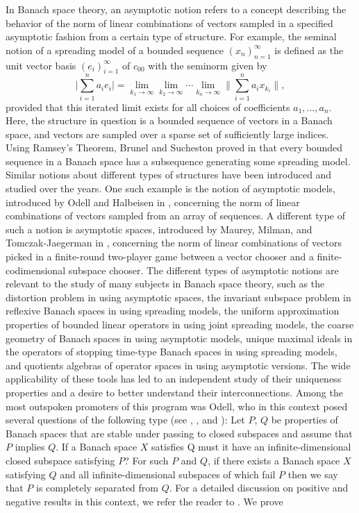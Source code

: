 \documentclass[12pt,a4paper]{amsart}
\theoremstyle{definition}
\theoremstyle{plain}
\begin{document}
In Banach space theory, an asymptotic notion refers to a concept describing the behavior of the norm of linear combinations of vectors sampled in a specified asymptotic fashion from a certain type of structure. For example, the seminal notion of a spreading model of a bounded sequence $(x_n)_{n=1}^\infty$ is defined as the unit vector basis $(e_i)_{i=1}^\infty$ of $c_{00}$ with the seminorm given by
\[\Big|\sum_{i=1}^na_i e_i\Big| = \lim_{k_1\to\infty}\lim_{k_{2}\to\infty}\cdots\lim_{k_n\to\infty}\Big\|\sum_{i=1}^na_ix_{k_i}\Big\|,\]
provided that this iterated limit exists for all choices of coefficients $a_1,\ldots,a_n$. Here, the structure in question is a bounded sequence of vectors in a Banach space, and vectors are sampled over a sparse set of sufficiently large indices. Using Ramsey's Theorem, Brunel and Sucheston proved in \cite{brunel:sucheston:1974} that every bounded sequence in a Banach space has a subsequence generating some spreading model. Similar notions about different types of structures have been introduced and studied over the years. One such example is the notion of asymptotic models, introduced by Odell and Halbeisen in \cite{halbeisen:odell:2004}, concerning the norm of linear combinations of vectors sampled from an array of sequences. A different type of such a notion is asymptotic spaces, introduced by Maurey, Milman, and Tomczak-Jaegerman in \cite{maurey:milman:tomczak-jaegermann:1995}, concerning the norm of linear combinations of vectors picked in a finite-round two-player game between a vector chooser and a finite-codimensional subspace chooser. The different types of asymptotic notions are relevant to the study of many subjects in Banach space theory, such as the distortion problem in \cite{milman:tomczak-jaegermann:1993} using asymptotic spaces, the invariant subspace problem in reflexive Banach spaces in \cite{argyros:motakis:2014} using spreading models, the uniform approximation properties of bounded linear operators in \cite{argyros:georgiou:lagos:motakis:2020} using joint spreading models, the coarse geometry of Banach spaces in \cite{baudier:lancien:motakis:schlumprecht:2021} using asymptotic models, unique maximal ideals in the operators of stopping time-type Banach spaces in \cite{kania:lechner:2022} using spreading models, and quotients algebras of operator spaces in \cite{motakis:pelczar-barwacz:2024} using asymptotic versions. The wide applicability of these tools has led to an independent study of their uniqueness properties and a desire to better understand their interconnections. Among the most outspoken promoters of this program was Odell, who in this context posed several questions of the following type (see \cite{odell:2002}, \cite{odell:2007}, and \cite{junge:kutzarova:odell:2006}): Let $P$, $Q$ be properties of Banach spaces that are stable under passing to closed subspaces and assume that $P$ implies $Q$. If a Banach space $X$ satisfies Q must it have an infinite-dimensional closed subspace satisfying $P$? For such $P$ and $Q$, if there exists a Banach space $X$ satisfying $Q$ and all infinite-dimensional subspaces of which fail $P$ then we say that $P$ is completely separated from $Q$. For a detailed discussion on positive and negative results in this context, we refer the reader to \cite{argyros:motakis:2020}. We prove 
\end{document}
